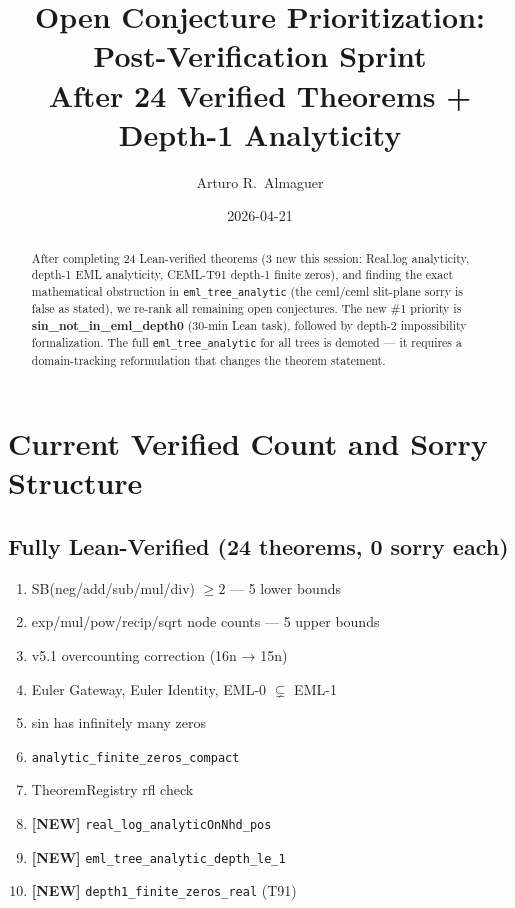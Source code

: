 \documentclass[12pt]{article}
\title{\textbf{Open Conjecture Prioritization: Post-Verification Sprint}\\[0.4em]
\large After 24 Verified Theorems + Depth-1 Analyticity}
\author{Arturo R.\ Almaguer}
\date{2026-04-21}
\theoremstyle{definition}
\begin{document}
\maketitle

\begin{abstract}
After completing 24 Lean-verified theorems (3 new this session: Real.log analyticity,
depth-1 EML analyticity, CEML-T91 depth-1 finite zeros), and finding the exact
mathematical obstruction in \texttt{eml\_tree\_analytic} (the ceml/ceml slit-plane sorry
is false as stated), we re-rank all remaining open conjectures.
The new \#1 priority is \textbf{sin\_not\_in\_eml\_depth0} (30-min Lean task),
followed by depth-2 impossibility formalization.
The full \texttt{eml\_tree\_analytic} for all trees is demoted — it requires
a domain-tracking reformulation that changes the theorem statement.
\end{abstract}

\section{Current Verified Count and Sorry Structure}

\subsection{Fully Lean-Verified (24 theorems, 0 sorry each)}
\begin{enumerate}[noitemsep]
  \item SB(neg/add/sub/mul/div) $\geq 2$ — 5 lower bounds
  \item exp/mul/pow/recip/sqrt node counts — 5 upper bounds
  \item v5.1 overcounting correction (16n → 15n)
  \item Euler Gateway, Euler Identity, EML-0 $\subsetneq$ EML-1
  \item sin has infinitely many zeros
  \item \texttt{analytic\_finite\_zeros\_compact}
  \item TheoremRegistry rfl check
  \item \textbf{[NEW]} \texttt{real\_log\_analyticOnNhd\_pos}
  \item \textbf{[NEW]} \texttt{eml\_tree\_analytic\_depth\_le\_1}
  \item \textbf{[NEW]} \texttt{depth1\_finite\_zeros\_real} (T91)
\end{enumerate}
\end{document}
